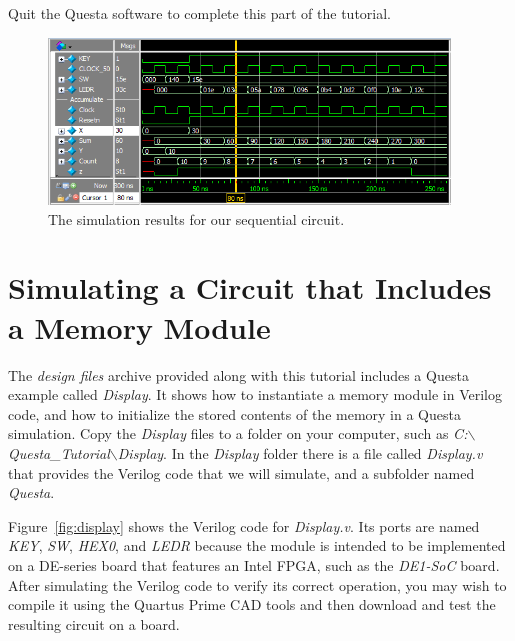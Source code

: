 \documentclass[11pt, twoside, pdftex]{article}
\begin{document}
\noindent
Quit the Questa software to complete this part of the tutorial.

\begin{figure}[h]
	\begin{center}
		\includegraphics[width = 0.95\textwidth]{figures/gui3.png}
	\end{center}
		  \caption{The simulation results for our sequential circuit.}
	\label{fig:gui3}
\end{figure}

\section{Simulating a Circuit that Includes a Memory Module}

The {\it design files} archive provided along with this tutorial includes a Questa example 
called {\it Display}. It shows how to instantiate a memory module in Verilog code, and how
to initialize the stored contents of the memory in a Questa simulation. Copy the {\it Display}
files to a folder on your computer, such as 
{\it C:$\backslash$Questa\_Tutorial$\backslash$Display}. 
In the {\it Display} folder there is a file called {\it Display.v}
that provides the Verilog code that we will simulate, and 
a subfolder named {\it Questa}.

\noindent
Figure~\ref{fig:display} shows the Verilog code for {\it Display.v}.
Its ports are named {\it KEY}, {\it SW}, {\it HEX0}, and {\it LEDR} because the module is intended 
to be implemented on a DE-series board that features an Intel FPGA, such as the {\it DE1-SoC}
board. After simulating the Verilog code to verify its correct operation, you may
wish to compile it using the Quartus Prime CAD tools and then download and test the 
resulting circuit on a board.  
\end{document}
